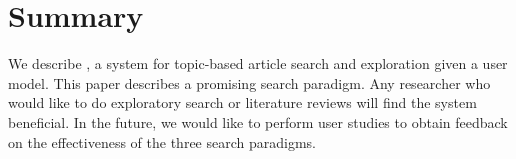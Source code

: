 
\section{Summary}

We describe \system, a system for topic-based article search
and exploration given a user model.
This paper describes a promising search paradigm.
Any researcher who would like to do exploratory search or literature 
reviews will find the system beneficial. In the future, 
we would like to perform user studies to obtain feedback on the 
effectiveness of the three search paradigms.

